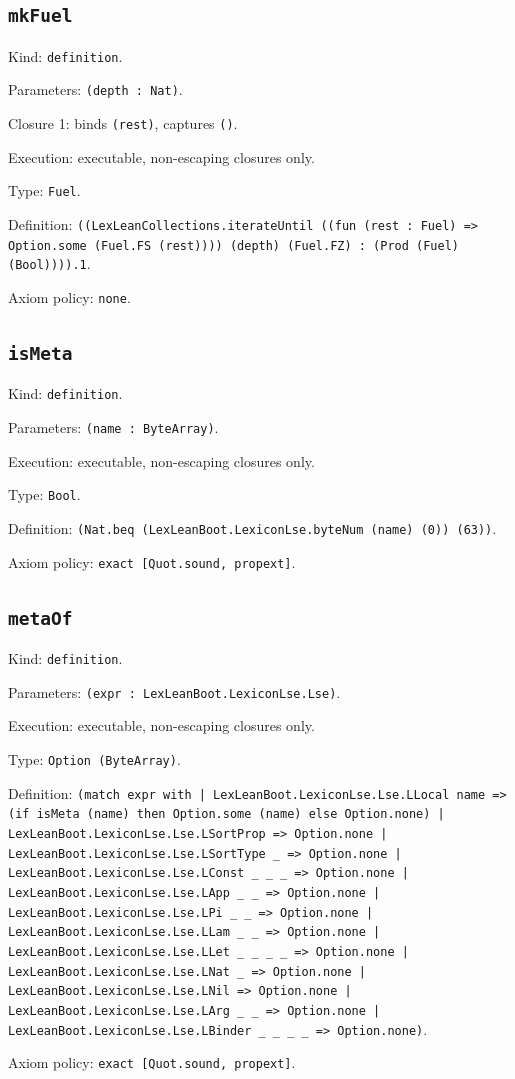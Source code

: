 \documentclass[11pt]{article}
\begin{document}
\subsection*{\texttt{mkFuel}}
\noindent Kind: \texttt{definition}.\par
\noindent Parameters: \texttt{(depth : Nat)}.\par
\noindent Closure 1: binds \texttt{(rest)}, captures \texttt{()}.\par
\noindent Execution: executable, non-escaping closures only.\par
\noindent Type: \texttt{Fuel}.\par
\noindent Definition: \texttt{((LexLeanCollections.iterateUntil ((fun (rest : Fuel) => Option.some (Fuel.FS (rest)))) (depth) (Fuel.FZ) : (Prod (Fuel) (Bool)))).1}.\par
\noindent Axiom policy: \texttt{none}.\par
\subsection*{\texttt{isMeta}}
\noindent Kind: \texttt{definition}.\par
\noindent Parameters: \texttt{(name : ByteArray)}.\par
\noindent Execution: executable, non-escaping closures only.\par
\noindent Type: \texttt{Bool}.\par
\noindent Definition: \texttt{(Nat.beq (LexLeanBoot.LexiconLse.byteNum (name) (0)) (63))}.\par
\noindent Axiom policy: \texttt{exact [Quot.sound, propext]}.\par
\subsection*{\texttt{metaOf}}
\noindent Kind: \texttt{definition}.\par
\noindent Parameters: \texttt{(expr : LexLeanBoot.LexiconLse.Lse)}.\par
\noindent Execution: executable, non-escaping closures only.\par
\noindent Type: \texttt{Option (ByteArray)}.\par
\noindent Definition: \texttt{(match expr with | LexLeanBoot.LexiconLse.Lse.LLocal name => (if isMeta (name) then Option.some (name) else Option.none) | LexLeanBoot.LexiconLse.Lse.LSortProp => Option.none | LexLeanBoot.LexiconLse.Lse.LSortType \_ => Option.none | LexLeanBoot.LexiconLse.Lse.LConst \_ \_ \_ => Option.none | LexLeanBoot.LexiconLse.Lse.LApp \_ \_ => Option.none | LexLeanBoot.LexiconLse.Lse.LPi \_ \_ => Option.none | LexLeanBoot.LexiconLse.Lse.LLam \_ \_ => Option.none | LexLeanBoot.LexiconLse.Lse.LLet \_ \_ \_ \_ => Option.none | LexLeanBoot.LexiconLse.Lse.LNat \_ => Option.none | LexLeanBoot.LexiconLse.Lse.LNil => Option.none | LexLeanBoot.LexiconLse.Lse.LArg \_ \_ => Option.none | LexLeanBoot.LexiconLse.Lse.LBinder \_ \_ \_ \_ => Option.none)}.\par
\noindent Axiom policy: \texttt{exact [Quot.sound, propext]}.\par
\end{document}
